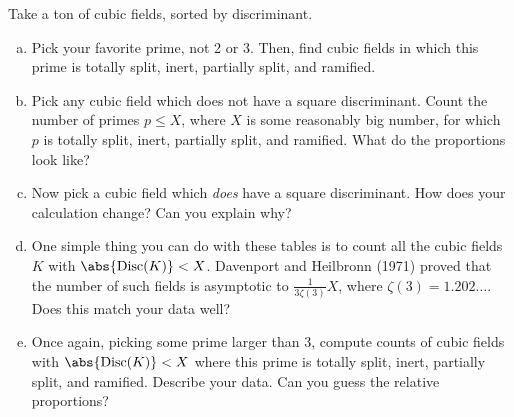 \documentclass[10pt]{amsart}
\begin{document}
\begin{thm}
  Take a ton of cubic fields, sorted by discriminant.
  \begin{enumerate}[(a)]
  \item
    Pick your favorite prime, not 2 or 3.
    Then, find cubic fields in which this prime is totally split, inert, partially split, and ramified.
  \item
    Pick any cubic field which does not have a square discriminant.
    Count the number of primes $p \leq X$, where $X$ is some reasonably big number, for which $p$ is totally split, inert, partially split, and ramified.
    What do the proportions look like?
  \item
    Now pick a cubic field which {\it does} have a square discriminant.
    How does your calculation change?
    Can you explain why?
  \item
    One simple thing you can do with these tables is to count all the cubic fields $K$ with $\abs{\operatorname{Disc}(K)} < X$.
    Davenport and Heilbronn (1971) proved that the number of such fields is asymptotic to $\frac{1}{3\zeta(3)}X$, where $\zeta(3) = 1.202\ldots$.
    Does this match your data well?
  \item
    Once again, picking some prime larger than 3, compute counts of cubic fields with $\abs{\operatorname{Disc}(K)} < X$ where this prime is totally split, inert, partially split, and ramified.
    Describe your data.
    Can you guess the relative proportions?
  \end{enumerate}


\end{thm}
\end{document}
